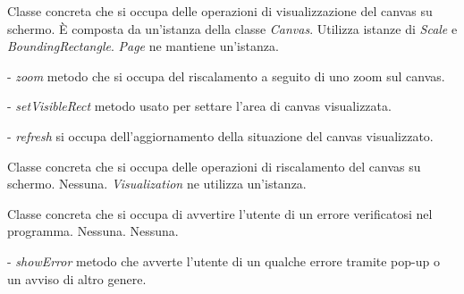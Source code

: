 Classe concreta che si occupa delle operazioni di visualizzazione del canvas su schermo. 
\` E composta da un'istanza della classe \textit{Canvas}. Utilizza istanze di \textit{Scale} e \textit{BoundingRectangle}.
\textit{Page} ne mantiene un'istanza.
\begin{elencopuntato}[\normindent]
\item[-]  \textit{zoom} metodo che si occupa del riscalamento a seguito di uno zoom sul canvas.
\item[-]  \textit{setVisibleRect} metodo usato per settare l'area di canvas visualizzata.
\item[-]  \textit{refresh} si occupa dell'aggiornamento della situazione del canvas visualizzato.
\end{elencopuntato}

Classe concreta che si occupa delle operazioni di riscalamento del canvas su schermo. 
Nessuna.
\textit{Visualization} ne utilizza un'istanza.

Classe concreta che si occupa di avvertire l'utente di un errore verificatosi nel programma.
Nessuna.
Nessuna.
\begin{elencopuntato}[\normindent]
\item[-]  \textit{showError} metodo che avverte l'utente di un qualche errore tramite pop-up o un avviso di altro genere.
\end{elencopuntato}


